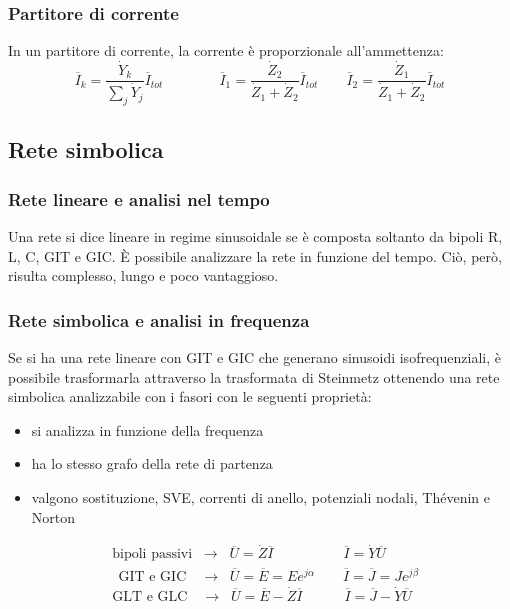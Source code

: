 \documentclass[a4paper]{article}
\begin{document}
\subsubsection*{Partitore di corrente}
In un partitore di corrente, la corrente è proporzionale all'ammettenza:
\[\overline{I}_k = \frac{\dot{Y}_k}{\sum_j \dot{Y}_j} \overline{I}_{tot} \qquad\qquad \overline{I}_1 = \frac{\dot{Z}_2}{\dot{Z}_1 + \dot{Z}_2} \overline{I}_{tot} \qquad \overline{I}_2 = \frac{\dot{Z}_1}{\dot{Z}_1 + \dot{Z}_2} \overline{I}_{tot}\]

\subsection{Rete simbolica}
\subsubsection*{Rete lineare e analisi nel tempo}
Una rete si dice lineare in regime sinusoidale se è composta soltanto da bipoli R, L, C, GIT e GIC. È possibile analizzare la
rete in funzione del tempo. Ciò, però, risulta complesso, lungo e poco vantaggioso.

\subsubsection*{Rete simbolica e analisi in frequenza}
Se si ha una rete lineare con GIT e GIC che generano sinusoidi isofrequenziali, è possibile trasformarla attraverso la trasformata
di Steinmetz ottenendo una rete simbolica analizzabile con i fasori con le seguenti proprietà:
\begin{itemize}
	\item si analizza in funzione della frequenza
	\item ha lo stesso grafo della rete di partenza
	\item valgono sostituzione, SVE, correnti di anello, potenziali nodali, Thévenin e Norton
\end{itemize}

\begin{align*}
	&\text{bipoli passivi} \;\; \rightarrow \;\; \overline{U} = \dot{Z} \overline{I} \qquad\qquad\quad \overline{I} = \dot{Y} \overline{U} \\
	&\;\, \text{GIT e GIC} \quad \rightarrow \;\; \overline{U} = \overline{E} = Ee^{j\alpha} \qquad \overline{I} = \overline{J} = Je^{j\beta} \\
	&\text{GLT e GLC} \quad \rightarrow \;\; \overline{U} = \overline{E} - \dot{Z} \overline{I} \qquad\quad \overline{I} = \overline{J} - \dot{Y} \overline{U}
\end{align*}
\end{document}
